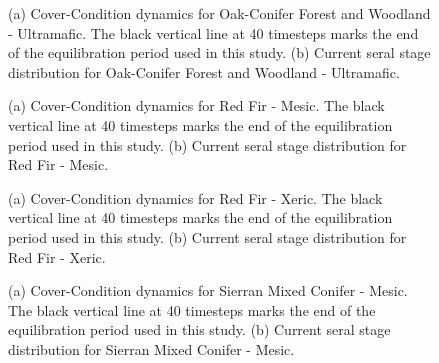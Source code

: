 \begin{figure}[!htbp]
  \centering
  \caption{(a) Cover-Condition dynamics for Oak-Conifer Forest and Woodland - Ultramafic. The black vertical line at 40 timesteps marks the end of the equilibration period used in this study. (b) Current seral stage distribution for Oak-Conifer Forest and Woodland - Ultramafic.} 
  \label{fig:covcond_ocfwu}
\end{figure}

\begin{figure}[!htbp]
  \centering
  \caption{(a) Cover-Condition dynamics for Red Fir - Mesic. The black vertical line at 40 timesteps marks the end of the equilibration period used in this study. (b) Current seral stage distribution for Red Fir - Mesic.} 
  \label{fig:covcond_rfrm}
\end{figure}

\begin{figure}[!htbp]
  \centering
  \caption{(a) Cover-Condition dynamics for Red Fir - Xeric. The black vertical line at 40 timesteps marks the end of the equilibration period used in this study. (b) Current seral stage distribution for Red Fir - Xeric.} 
  \label{fig:covcond_rfrx}
\end{figure}

\begin{figure}[!htbp]
  \centering
  \caption{(a) Cover-Condition dynamics for Sierran Mixed Conifer - Mesic. The black vertical line at 40 timesteps marks the end of the equilibration period used in this study. (b) Current seral stage distribution for Sierran Mixed Conifer - Mesic.} 
  \label{fig:covcond_smcm}
\end{figure}


